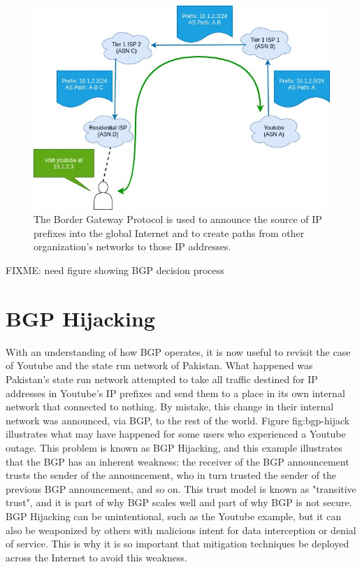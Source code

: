 \documentclass[conference]{IEEEtran}
\begin{document}
\begin{figure}
  \includegraphics[width=\linewidth]{images/bgp-ops.jpg}
  \caption{The Border Gateway Protocol is used to announce the source of IP prefixes into the global Internet and to create paths from other organization's networks to those IP addresses.}
  \label{fig:bgp-ops}
\end{figure}

FIXME: need figure showing BGP decision process

\section{BGP Hijacking}
With an understanding of how BGP operates, it is now useful to revisit the case of Youtube and the state run network of Pakistan.  What happened was Pakistan's state run network attempted to take all traffic destined for IP addresses in Youtube's IP prefixes and send them to a place in its own internal network that connected to nothing.  By mistake, this change in their internal network was announced, via BGP, to the rest of the world.  Figure {fig:bgp-hijack} illustrates what may have happened for some users who experienced a Youtube outage.  This problem is known as BGP Hijacking, and this example illustrates that the BGP has an inherent weakness: the receiver of the BGP announcement trusts the sender of the announcement, who in turn trusted the sender of the previous BGP announcement, and so on.  This trust model is known as "transitive trust", and it is part of why BGP scales well and part of why BGP is not secure.  BGP Hijacking can be unintentional, such as the Youtube example, but it can also be weaponized by others with malicious intent for data interception or denial of service.  This is why it is so important that mitigation techniques be deployed across the Internet to avoid this weakness.
\end{document}
